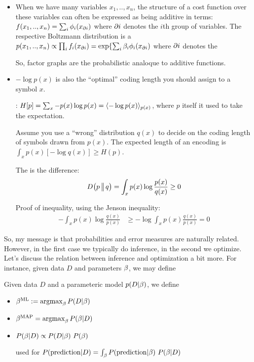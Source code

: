 \begin{itemize}
\item When we have many variables $x_1,..,x_n$, the structure of a
cost function over these variables can often be expressed as being
additive in terms: $f(x_1,..,x_n) = \sum_i \phi_i(x_{\partial i})$ where
$\partial i$ denotes the $i$th group of variables. The respective
Boltzmann distribution is a 
$p(x_1,..,x_n) \propto \prod_i f_i(x_{\partial i})
= \exp\{\sum_i \beta_i \phi_i(x_{\partial i})$ where $\partial i$ denotes the

So, factor graphs are the probabilistic analoque to additive functions.

\item $-\log p(x)$ is also the ``optimal'' coding length you should
assign to a symbol $x$.

: $H[p] = \sum_x -p(x) \log
p(x) = \langle - \log p(x) \rangle_{p(x)}$, where $p$ itself it used to take the expectation.

Assume you use a ``wrong'' distribution $q(x)$ to decide on the
coding length of symbols drawn from $p(x)$. The expected length of an
encoding is $\int_x p(x) [-\log q(x)] \ge H(p)$.

The  is the difference:
\begin{equation}
 D_{{}}\big(p\,\big|\!\big|\,q\big) = \int_x p(x) \log \frac{p(x)}{q(x)} \ge 0 
\end{equation}

Proof of inequality, using the Jenson inequality:
\begin{align}
- \int_x p(x) \log \frac{q(x)}{p(x)}
& \ge - \log \int_x p(x) \frac{q(x)}{p(x)} = 0
\end{align}

\end{itemize}

So, my message is that probabilities and error measures are naturally
related. However, in the first case we typically do inference, in the
second we optimize. Let's discuss the relation between inference and
optimization a bit more. For instance, given data $D$ and parameters $\beta$,
we may define

\begin{myDefinition}
Given data $D$ and a parameteric model $p(D|\beta)$, we define
\begin{itemize}
\item {}

$\beta^\text{ML} := \operatorname*{argmax}_\beta P(D | \beta)$

\item {}

$\beta^\text{MAP} = \operatorname*{argmax}_\beta P(\beta | D)$

\item {}

$P(\beta|D) \propto P(D|\beta)~ P(\beta)$

used for  $P(\text{prediction}|D) = \int_\beta P(\text{prediction} | \beta)~ P(\beta | D)$
\end{itemize}
\end{myDefinition}

